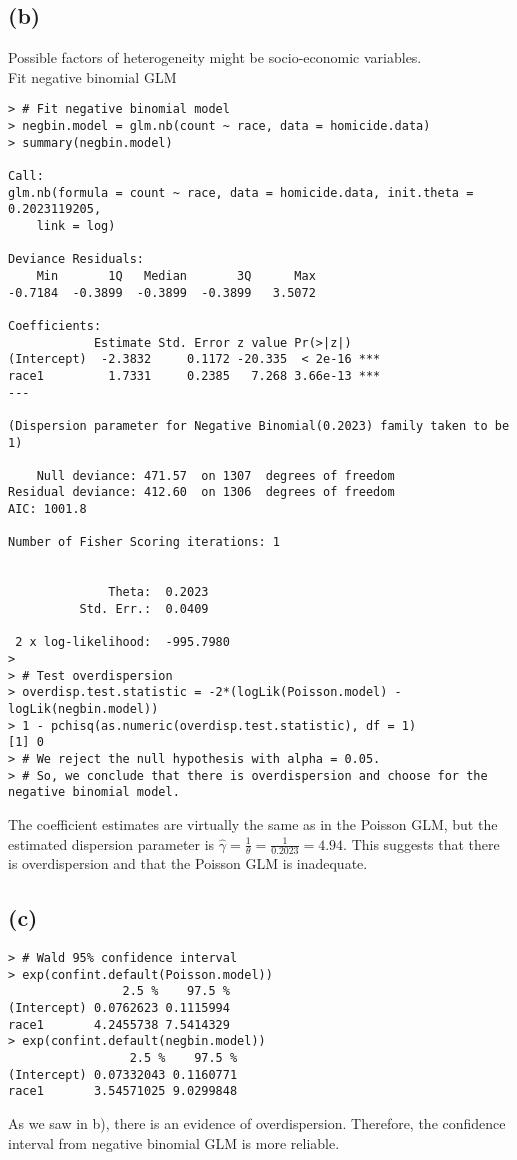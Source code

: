 \vspace{\baselineskip}
\subsection*{(b)}
Possible factors of heterogeneity might be socio-economic variables.\\

Fit negative binomial GLM
\begin{lstlisting}
> # Fit negative binomial model 
> negbin.model = glm.nb(count ~ race, data = homicide.data)
> summary(negbin.model)

Call:
glm.nb(formula = count ~ race, data = homicide.data, init.theta = 0.2023119205, 
    link = log)

Deviance Residuals: 
    Min       1Q   Median       3Q      Max  
-0.7184  -0.3899  -0.3899  -0.3899   3.5072  

Coefficients:
            Estimate Std. Error z value Pr(>|z|)    
(Intercept)  -2.3832     0.1172 -20.335  < 2e-16 ***
race1         1.7331     0.2385   7.268 3.66e-13 ***
---

(Dispersion parameter for Negative Binomial(0.2023) family taken to be 1)

    Null deviance: 471.57  on 1307  degrees of freedom
Residual deviance: 412.60  on 1306  degrees of freedom
AIC: 1001.8

Number of Fisher Scoring iterations: 1


              Theta:  0.2023 
          Std. Err.:  0.0409 

 2 x log-likelihood:  -995.7980 
> 
> # Test overdispersion
> overdisp.test.statistic = -2*(logLik(Poisson.model) - logLik(negbin.model))
> 1 - pchisq(as.numeric(overdisp.test.statistic), df = 1)
[1] 0
> # We reject the null hypothesis with alpha = 0.05.
> # So, we conclude that there is overdispersion and choose for the negative binomial model.
\end{lstlisting}

The coefficient estimates are virtually the same as in the Poisson GLM, but the estimated dispersion parameter is $\widehat{\gamma} = \frac{1}{\theta} = \frac{1}{0.2023} = 4.94$. This suggests that there is overdispersion and that the Poisson GLM is inadequate.


\vspace{\baselineskip}
\subsection*{(c)}
\begin{lstlisting}
> # Wald 95% confidence interval
> exp(confint.default(Poisson.model))
                2.5 %    97.5 %
(Intercept) 0.0762623 0.1115994
race1       4.2455738 7.5414329
> exp(confint.default(negbin.model))
                 2.5 %    97.5 %
(Intercept) 0.07332043 0.1160771
race1       3.54571025 9.0299848
\end{lstlisting}

As we saw in b), there is an evidence of overdispersion. Therefore, the confidence interval from negative binomial GLM is more reliable.\\
